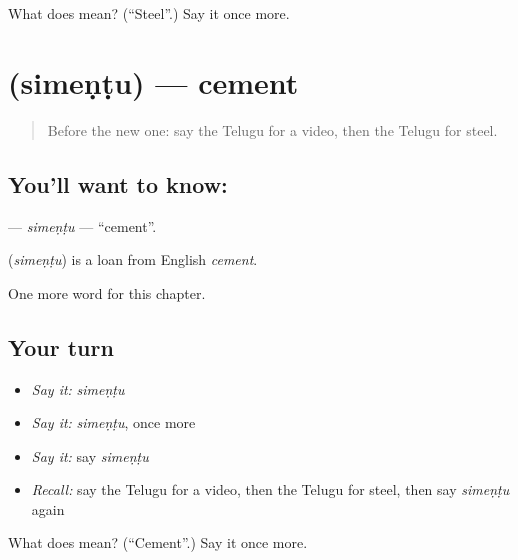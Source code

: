 \begin{tcolorbox}[breakable,colback=teal!4,colframe=teal!35!black,title={Before you move on}]
What does  mean? (\textquotedblleft{}Steel\textquotedblright{}.) Say it once more.
\end{tcolorbox}
\section[\texorpdfstring{\te{సిమెంటు} (simeṇṭu)}{సిమెంటు (simeṇṭu)}]{ (simeṇṭu) — cement}

\label{lesson:TE-C306-simentu}



\begin{quote}
Before the new one: say the Telugu for a video, then the Telugu for steel.
\end{quote}

\subsection*{You'll want to know: }
\textbf{} — \emph{simeṇṭu} — \textquotedblleft{}cement\textquotedblright{}.

\begin{cousinweb}
\textbf{} (\emph{simeṇṭu}) is a loan from English \emph{cement}.
\end{cousinweb}

\begin{grammarlens}[title={What you've built}]
One more word for this chapter.
\end{grammarlens}

\subsection*{Your turn}
\begin{itemize}
\raggedright
  \item \emph{Say it:} \emph{simeṇṭu}
  \item \emph{Say it:} \emph{simeṇṭu}, once more
  \item \emph{Say it:} say \emph{simeṇṭu}
  \item \emph{Recall:} say the Telugu for a video, then the Telugu for steel, then say \emph{simeṇṭu} again
\end{itemize}

\begin{tcolorbox}[breakable,colback=teal!4,colframe=teal!35!black,title={Before you move on}]
What does  mean? (\textquotedblleft{}Cement\textquotedblright{}.) Say it once more.
\end{tcolorbox}

